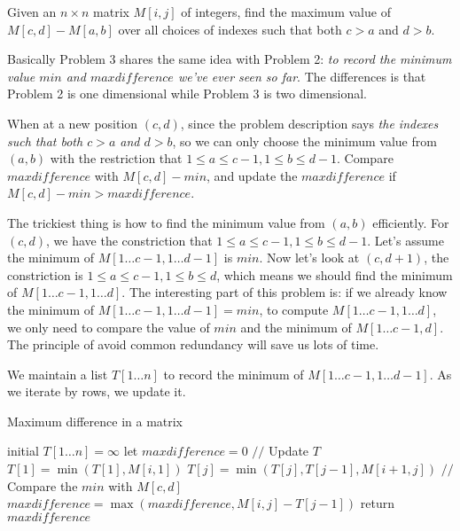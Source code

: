 \newpage
{} %

\problemdes

Given an $n \times n$ matrix $M[i, j]$ of integers, find the maximum value of $M[c, d]-M[a, b]$ over all choices of indexes such that both $c > a$ and $d > b$.

\solution


Basically Problem 3 shares the same idea with Problem 2: \textit{to record the minimum value $min$ and $maxdifference$ we've ever seen so far}. The differences is that Problem 2 is one dimensional while Problem 3 is two dimensional.

When at a new position $(c, d)$, since the problem description says \textit{the indexes such that both $c>a$ and $d>b$}, so we can only choose the minimum value from $(a,b)$ with the restriction that $1 \le a \le c-1, 1 \le b \le d-1$. Compare $maxdifference$ with $M[c, d]-min$, and update the $maxdifference$ if $M[c, d]-min > maxdifference$.

The trickiest thing is how to find the minimum value from $(a, b)$ efficiently. For $(c,d)$, we have the constriction that $1 \le a \le c-1, 1 \le b \le d-1$. Let's assume the minimum of $M[1 \dots c-1, 1 \dots d-1]$ is $min$. Now let's look at $(c, d+1)$, the constriction is $1 \le a \le c-1, 1 \le b \le d$, which means we should find the minimum of $M[1 \dots c-1, 1 \dots d]$. The interesting part of this problem is: if we already know the minimum of $M[1 \dots c-1, 1 \dots d-1]=min$, to compute $M[1 \dots c-1, 1 \dots d]$, we only need to compare the value of $min$ and the minimum of $M[1 \dots c-1, d]$. The principle of avoid common redundancy will save us lots of time.

We maintain a list $T[1 \dots n]$ to record the minimum of $M[1 \dots c-1, 1 \dots d-1]$. As we iterate by rows, we update it. 


\begin{algorithm}[]
  \caption{Maximum difference in a matrix}
  initial $T[1 \dots n] = \infty$ \;
  let $maxdifference = 0$\;
  {
    $//$ Update $T$ \;
    $T[1] = \min(T[1], M[i, 1])$\;
    {
        $T[j] = \min(T[j],  T[j-1], M[i+1, j])$ \;
    }
    $//$ Compare the $min$ with $M[c, d]$ \;
    {
        $maxdifference = \max(maxdifference, M[i, j] - T[j-1])$ \;
    }
  }
  return $maxdifference$\;
\end{algorithm}

